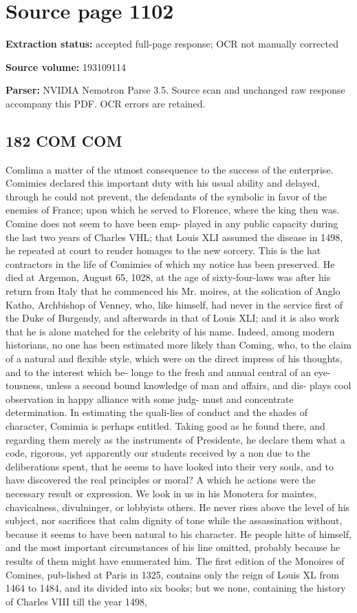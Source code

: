 \clearpage
\section{Source page 1102}
\textbf{Extraction status:} accepted full-page response; OCR not manually corrected\par
\textbf{Source volume:} 193109114\par
\textbf{Parser:} NVIDIA Nemotron Parse 3.5. Source scan and unchanged raw response accompany this PDF. OCR errors are retained.\par\medskip
\subsection*{182 COM COM}
Comlima a matter of the utmost consequence to the success of the enterprise. Comimies declared this important duty with his usual ability and delayed, through he could not prevent, the defendants of the symbolic in favor of the enemies of France; upon which he served to Florence, where the king then was. Comine does not seem to have been emp- played in any public capacity during the last two years of Charles VHL; that Louis XLI assumed the disease in 1498, he repeated at court to render homages to the new sorcery. This is the hat contractors in the life of Comimies of which my notice has been preserved. He died at Argemon, August 65, 1028, at the age of sixty-four-laws was after his return from Italy that he commenced his Mr. moires, at the solication of Anglo Katho, Archbishop of Venney, who, like himself, had never in the service first of the Duke of Burgendy, and afterwards in that of Louis XLI; and it is also work that he is alone matched for the celebrity of his name. Indeed, among modern historians, no one has been estimated more likely than Coming, who, to the claim of a natural and flexible style, which were on the direct impress of his thoughts, and to the interest which be- longe to the fresh and annual central of an eye-tousness, unless a second bound knowledge of man and affairs, and dis- plays cool observation in happy alliance with some judg- must and concentrate determination. In estimating the quali-lies of conduct and the shades of character, Comimia is perhaps entitled. Taking good as he found there, and regarding them merely as the instruments of Presidente, he declare them what a code, rigorous, yet apparently our students received by a non due to the deliberations spent, that he seems to have looked into their very souls, and to have discovered the real principles or moral? A which he actions were the necessary result or expression. We look in us in his Monotera for maintes, chavicalness, divulninger, or lobbyists others. He never rises above the level of his subject, nor sacrifices that calm dignity of tone while the assassination without, because it seems to have been natural to his character. He people hitte of himself, and the most important circumstances of his line omitted, probably because he results of them might have enumerated him. The first edition of the Monoires of Comines, pub-lished at Paris in 1325, contains only the reign of Louis XL from 1464 to 1484, and its divided into six books; but we none, containing the history of Charles VIII till the year 1498, 